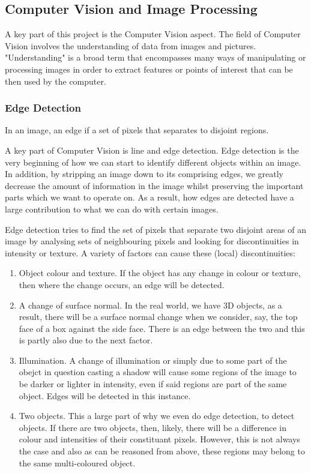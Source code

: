 \documentclass[11pt]{report}
\begin{document}
\subsection*{Computer Vision and Image Processing}
A key part of this project is the Computer Vision aspect. The field of
Computer Vision involves the understanding of data from images and pictures.
"Understanding" is a broad term that encompasses many ways of manipulating or
processing images in order to extract features or points of interest that
can be then used by the computer.

\subsubsection*{Edge Detection}

\begin{center}
	In an image, an edge if a set of pixels that separates to disjoint
	regions.
\end{center}

A key part of Computer Vision is line and edge detection. Edge detection is
the very beginning of how we can start to identify different objects 
within an image. In addition, by stripping an image down to its comprising
edges, we greatly decrease the amount of information in the image whilst
preserving the important parts which we want to operate on. 
As a result, how edges are detected have a large contribution
to what we can do with certain images.  

Edge detection tries to find the set of pixels that separate two 
disjoint areas of an image by analysing sets of neighbouring pixels and 
looking for discontinuities in intensity or texture. A variety of factors
can cause these (local) discontinuities:
\begin{enumerate}
	\item Object colour and texture. If the object has any change in colour or
		  texture, then where the change occurs, an edge will be detected.
	\item A change of surface normal. In the real world, we have 3D objects,
		  as a result, there will be a surface normal change when we consider,
		  say, the top face of a box against the side face. There is an edge
		  between the two and this is partly also due to the next factor.
	\item Illumination. A change of illumination or simply due to some
		  part of the obejct in question casting a shadow will cause some regions
		  of the image to be darker or lighter in intensity, even if said
		  regions are part of the same object. Edges will be detected in this
		  instance.
	\item Two objects. This a large part of why we even do edge detection, to
		  detect objects. If there are two objects, then, likely, there will be
		  a difference in colour and intensities of their constituant pixels.
		  However, this is not always the case and also as can be reasoned from
		  above, these regions may belong to the same multi-coloured object.
\end{enumerate}
\end{document}
